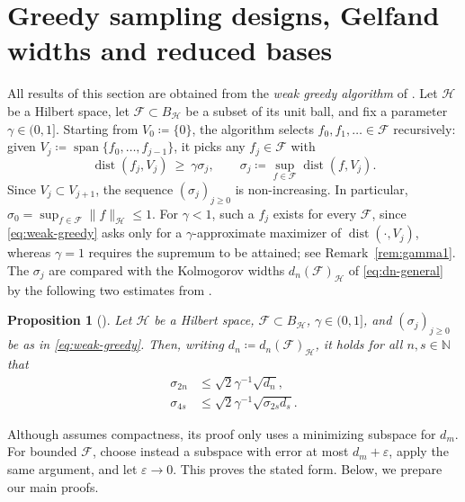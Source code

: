 \documentclass[11pt,reqno, a4paper]{article}
\numberwithin{equation}{section}
\DeclareMathOperator{\dist}{dist}
\newtheorem{proposition}[theorem]{Proposition}
\newcommand{\N}{\mathbb{N}}
\newcommand{\norm}[1]{\lVert #1\rVert}
\DeclareMathOperator{\spann}{span}
\begin{document}
 
\section{Greedy sampling designs, Gelfand widths and reduced bases}\label{sec:greedy}

All results of this section are obtained from the \emph{weak greedy algorithm} of \cite{BCDDPW11,DPW13}.
Let $\mathcal H$ be a Hilbert space, let $\mathcal{F}\subset B_{\mathcal H}$ be a subset of its unit ball, and fix a parameter $\gamma\in(0,1]$.
Starting from $V_0\coloneqq\{0\}$, the algorithm selects $f_0,f_1,\dots\in\mathcal{F}$ recursively: given $V_j\coloneqq\spann\{f_0,\dots,f_{j-1}\}$, it picks any $f_j\in\mathcal F$ with
\begin{equation}\label{eq:weak-greedy}
    \dist(f_j,V_j)\ \ge\ \gamma \sigma_j,
    \qquad
    \sigma_j\coloneqq\sup_{f\in\mathcal{F}}\dist(f,V_j).
\end{equation}
Since $V_j\subset V_{j+1}$, the sequence $(\sigma_j)_{j\ge0}$ is non-increasing.
In particular, $\sigma_0=\sup_{f\in\mathcal F}\norm{f}_{\mathcal H}\le1$.
For $\gamma<1$, such a $f_j$ exists for every $\mathcal F$, since \eqref{eq:weak-greedy} asks only for a $\gamma$-approximate maximizer of $\dist(\cdot,V_j)$, whereas $\gamma=1$ requires the supremum to be attained; see Remark~\ref{rem:gamma1}.
The $\sigma_j$ are compared with the Kolmogorov widths $d_n(\mathcal F)_{\mathcal H}$ of \eqref{eq:dn-general} by the following two estimates from \cite{DPW13}.

\begin{proposition}[{\cite[Cor.~3.3(i) and eq.~(3.7)]{DPW13}}]\label{prop:dpw}
Let $\mathcal H$ be a Hilbert space, $\mathcal F\subset B_{\mathcal H}$, $\gamma\in(0,1]$, and $(\sigma_j)_{j\ge0}$ be as in \eqref{eq:weak-greedy}.
Then, writing $d_n\coloneqq d_n(\mathcal F)_{\mathcal H}$, it holds for all $n,s\in\N$ that
\begin{align}
    \sigma_{2n} &\le \sqrt2 \gamma^{-1} \sqrt{d_n}, \label{eq:DPWi}\\
    \sigma_{4s} &\le \sqrt2 \gamma^{-1} \sqrt{\sigma_{2s} d_s}. \label{eq:DPW37}
\end{align}
\end{proposition}

Although \cite{DPW13} assumes compactness, its proof only uses a minimizing subspace for $d_m$.
For bounded $\mathcal F$, choose instead a subspace with error at most $d_m+\varepsilon$, apply the same argument, and let $\varepsilon\to0$.
This proves the stated form.
Below, we prepare our main proofs.
\end{document}
